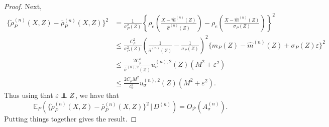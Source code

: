 \documentclass[aos]{imsart}
\newcommand{\E}{\mathbb{E}}
\newcommand{\given}{\,|\,}
\newcommand{\independent}{\mbox{${}\perp\mkern-11mu\perp{}$}}
\begin{document}
\begin{proof}
		Next,
		\begin{align*}
			\{\check{\rho}^{(n)}_P(X, Z) - \bar{\rho}^{(n)}_P(X, Z)\}^2 &= \frac{1}{\sigma_P^2(Z)}\left\{ \rho_{e}\left( \frac{X - \hat{m}^{(n)}(Z)}{\hat{\sigma}^{(n)}(Z)}\right) - \rho_{e}\left( \frac{X - \hat{m}^{(n)}(Z)}{\sigma_P(Z)}\right)\right\}^2 \\
			&\leq \frac{C_\rho^2}{\sigma_P^2(Z) }\left(\frac{1}{\hat{\sigma}^{(n)}(Z)} - \frac{1}{\sigma_P(Z)} \right)^2 \{m_P(Z) - \hat{m}^{(n)}(Z) + \sigma_{P}(Z) \varepsilon \}^2\\
			&\leq \frac{2C_\rho^2}{\hat{\sigma}^{(n),2}(Z)} u_{\sigma}^{(n),2}(Z) ( M^2 + \varepsilon^2) \\
			&\leq \frac{2 C_\rho M^2}{c_{\sigma}^2} u_{\sigma}^{(n),2}(Z) ( M^2 + \varepsilon^2).
		\end{align*}
		Thus using  that $\varepsilon \independent Z$, we have that
		\[
		\E_P \left( 	\{\check{\rho}^{(n)}_P(X, Z) - \bar{\rho}^{(n)}_P(X, Z)\}^2 \given D^{(n)}\right) = O_{\mathcal{P}}(A_{\sigma}^{(n)}).
		\]
		Putting things together gives the result.
		

\end{proof}
\end{document}
